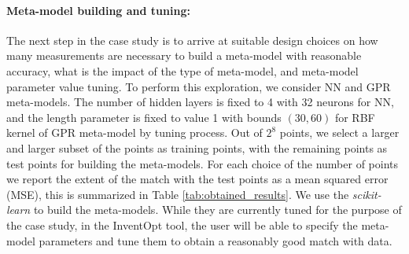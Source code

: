 \paragraph{Meta-model building and tuning:} The next step in the case study is to arrive at suitable design choices on how many measurements are necessary to build a meta-model with reasonable accuracy, what is the impact of the type of meta-model, and meta-model parameter value tuning. To perform this exploration, we consider NN and GPR meta-models. The number of hidden layers is fixed to 4 with 32 neurons for NN, and the length parameter is fixed to value 1 with bounds $(30,60)$ for RBF kernel of GPR meta-model by tuning process. Out of $2^8$ points, we select a larger and larger subset of the points as training points, with the remaining points as test points for building the meta-models. For each choice of the number of points we report the extent of the match with the test points as a mean squared error (MSE), this is summarized in Table \ref{tab:obtained_results}. We use the \textit{scikit-learn} \cite{scikit-learn} to build the meta-models. While they are currently tuned for the purpose of the case study, in the InventOpt tool, the user will be able to specify the meta-model parameters and tune them to obtain a reasonably good match with data.


